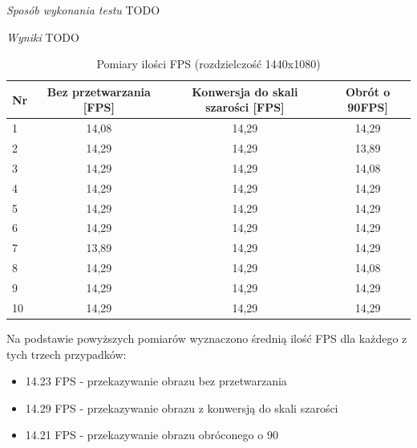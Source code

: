 \documentclass[a4paper,11pt,twoside]{report}
\theoremstyle{definition}
\begin{document}
\begin{description}
\textit{Sposób wykonania testu}
TODO

\textit{Wyniki}
TODO

\begin{table}[H]
\centering
\begin{tabular}{lccc}
Nr & Bez przetwarzania {[}FPS{]} & Konwersja do skali szarości {[}FPS{]} & Obrót o 90\textdegree {[}FPS{]} \\ \hline
1  & 14,08                       & 14,29                                 & 14,29                           \\
2  & 14,29                       & 14,29                                 & 13,89                           \\
3  & 14,29                       & 14,29                                 & 14,08                           \\
4  & 14,29                       & 14,29                                 & 14,29                           \\
5  & 14,29                       & 14,29                                 & 14,29                           \\
6  & 14,29                       & 14,29                                 & 14,29                           \\
7  & 13,89                       & 14,29                                 & 14,29                           \\
8  & 14,29                       & 14,29                                 & 14,08                           \\
9  & 14,29                       & 14,29                                 & 14,29                           \\
10 & 14,29                       & 14,29                                 & 14,29                           
\end{tabular}
\caption{Pomiary ilości FPS (rozdzielczość 1440x1080)}
\end{table}

Na podstawie powyższych pomiarów wyznaczono średnią ilość FPS dla każdego z tych trzech przypadków:

\begin{itemize}
\item 14.23 FPS - przekazywanie obrazu bez przetwarzania 
\item 14.29 FPS - przekazywanie obrazu z konwersją do skali szarości
\item 14.21 FPS - przekazywanie obrazu obróconego o 90\textdegree
\end{itemize}

\end{description}
\end{document}

